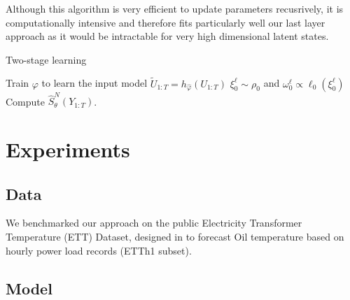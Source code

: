 \documentclass[journal]{IEEEtran}
\begin{document}
Although this algorithm is very efficient to update parameters recusrively, it is computationally intensive and therefore fits particularly well our last layer approach as it would be intractable for very high dimensional latent states.

\begin{algorithm}
	\caption{Two-stage learning}
	\label{alg:particle_filter}
	Train $\varphi$ to learn the input model $\widetilde U_{1:T} = h_{\hat\varphi}(U_{1:T})$\;
	$\xi_0^\ell \sim \rho_0$ and $\omega_0^{\ell} \propto \ell_0 \left(\xi^{\ell}_0\right)$\;
	Compute $\widehat {S}^N_\theta(Y_{1:T}) $.
\end{algorithm}

\section{Experiments}
\label{sec:exp}
\subsection{Data}
\label{sub:data}
We benchmarked our approach on the public Electricity Transformer Temperature (ETT) Dataset, designed in \cite{Zhou2021Informer} to forecast Oil temperature based on hourly power load records (ETTh1 subset).

\subsection{Model}%
\label{sub:models}
\end{document}
